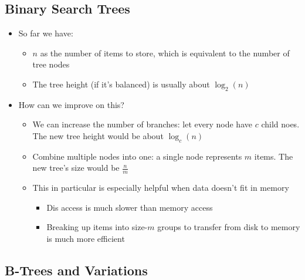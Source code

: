 \documentclass[
  10pt,
  english,
  letterpaper,
,tablecaptionabove
]{scrartcl}
\providecommand{\tightlist}{%
  \setlength{\itemsep}{0pt}\setlength{\parskip}{0pt}}
\begin{document}
\hypertarget{binary-search-trees}{%
\subsection{Binary Search Trees}\label{binary-search-trees}}

\begin{itemize}
\tightlist
\item
  So far we have:

  \begin{itemize}
  \tightlist
  \item
    \(n\) as the number of items to store, which is equivalent to the
    number of tree nodes
  \item
    The tree height (if it's balanced) is usually about \(\log_2(n)\)
  \end{itemize}
\item
  How can we improve on this?

  \begin{itemize}
  \tightlist
  \item
    We can increase the number of branches: let every node have \(c\)
    child noes. The new tree height would be about \(\log_c(n)\)
  \item
    Combine multiple nodes into one: a single node represents \(m\)
    items. The new tree's size would be \(\frac{n}{m}\)
  \item
    This in particular is especially helpful when data doesn't fit in
    memory

    \begin{itemize}
    \tightlist
    \item
      Dis access is much slower than memory access
    \item
      Breaking up items into size-\(m\) groups to transfer from disk to
      memory is much more efficient
    \end{itemize}
  \end{itemize}
\end{itemize}

\hypertarget{b-trees-and-variations}{%
\subsection{B-Trees and Variations}\label{b-trees-and-variations}}
\end{document}

